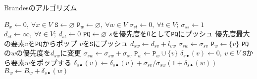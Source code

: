\begin{algorithm}[H]
  \caption{Brandesのアルゴリズム}
  \label{alg:brandes}
    \begin{algorithmic}[1]\small
      \State $B_x\gets 0,\:\forall x\in V$
      \State $\texttt{S}\gets\varnothing$
      \State $\texttt{P}_w\gets\varnothing,\:\forall w\in V$
      \State $\sigma_{st}\gets 0,\:\forall t\in V;\:\sigma_{ss}\gets 1$
      \State $d_{st}\gets\infty,\:\forall t\in V;\:d_{st}\gets 0$
      \State $\texttt{PQ}\gets\varnothing$
      \State $s$を優先度を$0$として$\texttt{PQ}$にプッシュ
      \State 優先度最大の要素$v$を$\texttt{PQ}$からポップ
      \State $v$を$\texttt{S}$にプッシュ
      \State $d_{sw}\gets d_{sv}+l_{vw}$
      \State $\sigma_{sw}\gets\sigma_{sv}$
      \State $\texttt{P}_w\gets\{v\}$
      \State $\texttt{PQ}$の$w$の優先度を$d_{sw}$に変更
      \EndIf
      \State $\sigma_{sw}\gets\sigma_{sw}+\sigma_{sv}$
      \State $\texttt{P}_w\gets\texttt{P}_w\cup\{v\}$
      \EndIf
      \EndFor
      \EndWhile
      \State $\delta_{s\bullet}(v)\gets 0,\:v\in V$
      \State $\texttt{S}$から要素$w$をポップする
      \State $\delta_{s\bullet}(v)\gets\delta_{s\bullet}(v)+\sigma_{sv}/\sigma_{sw}(1+\delta_{s\bullet}(w))$
      \EndFor
      \State $B_w\gets B_w+\delta_{s\bullet}(w)$
      \EndIf
      \EndWhile
      \EndFor
      \EndProcedure
    \end{algorithmic}
\end{algorithm}

